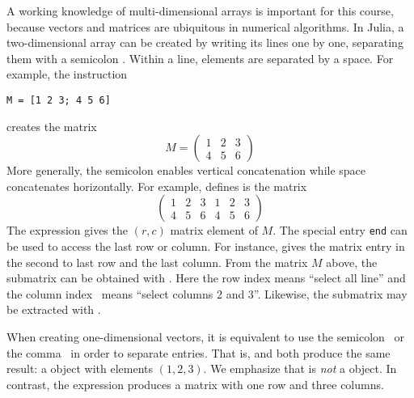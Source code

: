 A working knowledge of multi-dimensional arrays is important for this course,
because vectors and matrices are ubiquitous in numerical algorithms.
In Julia, a two-dimensional array can be created by writing its lines one by one,
separating them with a semicolon \julia{;}.
Within a line, elements are separated by a space.
For example,
the instruction
\begin{verbatim}
M = [1 2 3; 4 5 6]
\end{verbatim}
creates the matrix
\[
    M =
    \begin{pmatrix}
        1 & 2 & 3 \\ 4 & 5 & 6
    \end{pmatrix}
\]
More generally,
the semicolon enables vertical concatenation
while space concatenates horizontally.
For example, \julia{[M M]} defines is the matrix
\[
    \begin{pmatrix}
        1 & 2 & 3 & 1 & 2 & 3 \\ 4 & 5 & 6 & 4 & 5 & 6
    \end{pmatrix}
\]
The expression  gives the $(r, c)$ matrix element of $M$.
The special entry \texttt{end} can be used to access the last row or column.
For instance,  gives the matrix entry in the second to last row and the last column.
From the matrix $M$ above, 
the submatrix \julia{[2  3; 5 6]} can be obtained with .
Here the row index \julia{:} means ``select all line'' and the column index~ means ``select columns 2 and 3''.
Likewise, the submatrix \julia{[1 3; 4 6]} may be extracted with .
\begin{remark}
    When creating one-dimensional vectors, 
    it is equivalent to use the semicolon~\julia{;} or the comma~\julia{,} in order to separate entries.
    That is,  and  both produce the same result:
    a  object with elements $(1, 2, 3)$.
    We emphasize that  is \emph{not} a  object.
    In contrast, the expression  produces a matrix with one row and three columns.
\end{remark}

